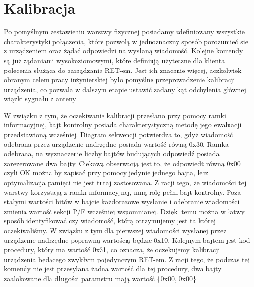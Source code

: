     \section{Kalibracja}
    Po pomyślnym zestawieniu warstwy fizycznej posiadamy zdefiniowany wszystkie charakterystyki połączenia, 
    które pozwolą w jednoznaczny sposób porozumieć sie z urządzeniem oraz żądać odpowiedzi na wysłaną wiadomość.
	Kolejne komendy są już żądaniami wysokoziomowymi, które definiują użyteczne dla klienta polecenia służąca do zarządzania RET-em.
    Jest ich znacznie więcej, aczkolwiek obranym celem pracy inżynierskiej było pomyślne przeprowadzenie kalibracji urządzenia, 
    co pozwala w dalszym etapie ustawić zadany kąt odchylenia głównej wiązki sygnału z anteny.

    W związku z tym, że oczekiwanie kalibracji przesłano przy pomocy ramki informacyjnej, bajt kontrolny posiada
    charakterystyczną metodę jego ewaluacji przedstawioną wcześniej. Diagram sekwencji
    potwierdza to, gdyż wiadomość odebrana przez urządzenie nadrzędne posiada wartość równą 0x30.
    Ramka odebrana, na wyznaczenie liczby bajtów budujących odpowiedź posiada zarezerowane dwa bajty. 
    Ciekawą obserwacją jest to, że odpowiedź równą 0x00 czyli OK można by zapisać przy pomocy jedynie jednego bajta, lecz optymalizacja
    pamięci nie jest tutaj zastosowana.
    \newline\newline
	Z racji tego, że wiadomości tej warstwy korzystają z ramki informacyjnej, inną rolę pełni bajt kontrolny. Poza stałymi wartości bitów w bajcie 
	każdorazowe wysłanie i odebranie wiadomości zmienia wartość sekcji P/F wcześniej wspomnianej. 
	Dzięki temu można w łatwy sposób identyfikować czy wiadomość, którą otrzymujemy jest ta której oczekiwaliśmy. 
	W związku z tym dla pierwszej wiadomości wysłanej przez urządzenie nadrzędne poprawną wartością będzie 0x10.
	\newline
	Kolejnym bajtem jest kod procedury, który ma wartość 0x31, co oznacza, że oczekujemy kalibracji urządzenia będącego zwykłym pojedynczym RET-em.
	\newline
	Z racji tego, że podczas tej komendy nie jest przesyłana żadna wartość dla tej procedury, dwa bajty zaalokowane dla długości parametru mają wartość \{0x00, 0x00\}

